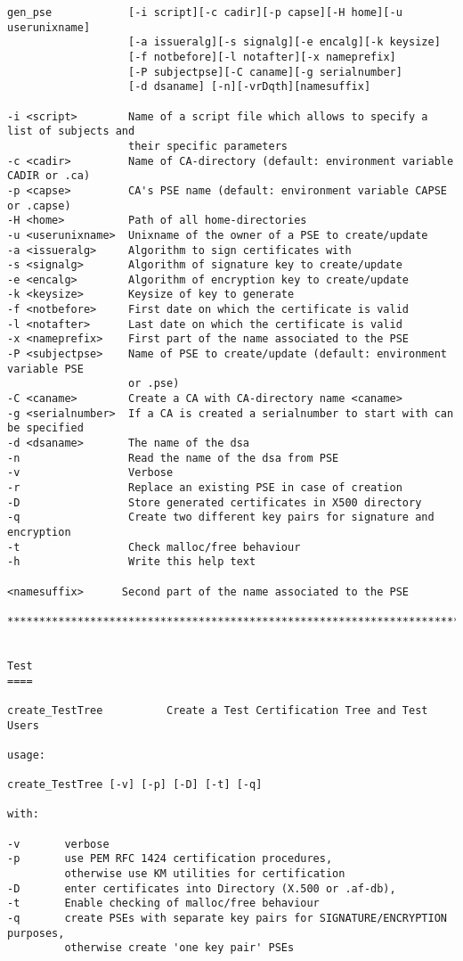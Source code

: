{\begin{verbatim}
gen_pse            [-i script][-c cadir][-p capse][-H home][-u userunixname]
                   [-a issueralg][-s signalg][-e encalg][-k keysize]
                   [-f notbefore][-l notafter][-x nameprefix]
                   [-P subjectpse][-C caname][-g serialnumber]
                   [-d dsaname] [-n][-vrDqth][namesuffix]
                   
-i <script>        Name of a script file which allows to specify a list of subjects and 
                   their specific parameters
-c <cadir>         Name of CA-directory (default: environment variable CADIR or .ca)
-p <capse>         CA's PSE name (default: environment variable CAPSE or .capse)
-H <home>          Path of all home-directories
-u <userunixname>  Unixname of the owner of a PSE to create/update
-a <issueralg>     Algorithm to sign certificates with
-s <signalg>       Algorithm of signature key to create/update
-e <encalg>        Algorithm of encryption key to create/update
-k <keysize>       Keysize of key to generate
-f <notbefore>     First date on which the certificate is valid
-l <notafter>      Last date on which the certificate is valid
-x <nameprefix>    First part of the name associated to the PSE
-P <subjectpse>    Name of PSE to create/update (default: environment variable PSE 
                   or .pse)
-C <caname>        Create a CA with CA-directory name <caname>
-g <serialnumber>  If a CA is created a serialnumber to start with can be specified
-d <dsaname>       The name of the dsa
-n                 Read the name of the dsa from PSE
-v                 Verbose
-r                 Replace an existing PSE in case of creation
-D                 Store generated certificates in X500 directory
-q                 Create two different key pairs for signature and encryption
-t                 Check malloc/free behaviour
-h                 Write this help text
                   
<namesuffix>      Second part of the name associated to the PSE

****************************************************************************************


Test
====

create_TestTree          Create a Test Certification Tree and Test Users 
 
usage: 
 
create_TestTree [-v] [-p] [-D] [-t] [-q] 
 
with: 
 
-v       verbose 
-p       use PEM RFC 1424 certification procedures, 
         otherwise use KM utilities for certification 
-D       enter certificates into Directory (X.500 or .af-db), 
-t       Enable checking of malloc/free behaviour 
-q       create PSEs with separate key pairs for SIGNATURE/ENCRYPTION purposes, 
         otherwise create 'one key pair' PSEs
 

\end{verbatim}}
